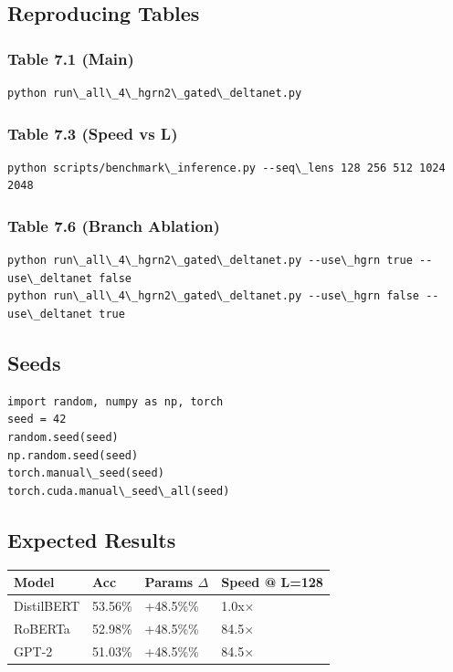 \subsection{Reproducing Tables}

\subsubsection{Table 7.1 (Main)}
\begin{lstlisting}
python run\_all\_4\_hgrn2\_gated\_deltanet.py
\end{lstlisting}

\subsubsection{Table 7.3 (Speed vs L)}
\begin{lstlisting}
python scripts/benchmark\_inference.py --seq\_lens 128 256 512 1024 2048
\end{lstlisting}

\subsubsection{Table 7.6 (Branch Ablation)}
\begin{lstlisting}
python run\_all\_4\_hgrn2\_gated\_deltanet.py --use\_hgrn true --use\_deltanet false
python run\_all\_4\_hgrn2\_gated\_deltanet.py --use\_hgrn false --use\_deltanet true
\end{lstlisting}

\subsection{Seeds}

\begin{lstlisting}
import random, numpy as np, torch
seed = 42
random.seed(seed)
np.random.seed(seed)
torch.manual\_seed(seed)
torch.cuda.manual\_seed\_all(seed)
\end{lstlisting}

\subsection{Expected Results}

\begin{table}[H]
\centering
\small
\begin{tabular}{llll}
\toprule
\textbf{Model} & \textbf{Acc} & \textbf{Params $\Delta$} & \textbf{Speed @ L=128} \\
\midrule
DistilBERT & 53.56\% & +48.5\%\% & 1.0x$\times$ \\
RoBERTa & 52.98\% & +48.5\%\% & 84.5$\times$ \\
GPT-2 & 51.03\% & +48.5\%\% & 84.5$\times$ \\
\bottomrule
\end{tabular}
\end{table}

